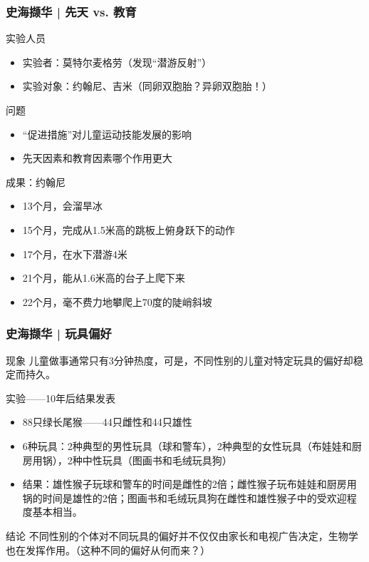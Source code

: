 \begin{frame}
  \frametitle{史海撷华 | 先天 vs. 教育}
  \begin{block}{实验人员}
    \begin{itemize}
      \item 实验者：莫特尔\textbullet 麦格劳（发现“潜游反射”）
      \item 实验对象：约翰尼、吉米（同卵双胞胎？异卵双胞胎！）
    \end{itemize}
  \end{block}
  \vspace{-0.5em}
  \pause
  \begin{block}{问题}
    \begin{itemize}
      \item “促进措施”对儿童运动技能发展的影响
      \item 先天因素和教育因素哪个作用更大
    \end{itemize}
  \end{block}
  \vspace{-0.5em}
  \pause
  \begin{block}{成果：约翰尼}
    \begin{itemize}
      \item 13个月，会溜旱冰
      \item 15个月，完成从1.5米高的跳板上俯身跃下的动作
      \item 17个月，在水下潜游4米
      \item 21个月，能从1.6米高的台子上爬下来
      \item 22个月，毫不费力地攀爬上70度的陡峭斜坡
    \end{itemize}
  \end{block}
\end{frame}

\begin{frame}
  \frametitle{史海撷华 | 玩具偏好}
  \begin{block}{现象}
    儿童做事通常只有3分钟热度，可是，不同性别的儿童对特定玩具的偏好却稳定而持久。
  \end{block}
  \vspace{-0.5em}
  \pause
  \begin{block}{实验——10年后结果发表}
    \begin{itemize}
      \item 88只绿长尾猴——44只雌性和44只雄性
      \item 6种玩具：2种典型的男性玩具（球和警车），2种典型的女性玩具（布娃娃和厨房用锅），2种中性玩具（图画书和毛绒玩具狗）
      \item 结果：雄性猴子玩球和警车的时间是雌性的2倍；雌性猴子玩布娃娃和厨房用锅的时间是雄性的2倍；图画书和毛绒玩具狗在雌性和雄性猴子中的受欢迎程度基本相当。
    \end{itemize}
  \end{block}
  \vspace{-0.5em}
  \pause
  \begin{block}{结论}
    不同性别的个体对不同玩具的偏好并不仅仅由家长和电视广告决定，生物学也在发挥作用。（这种不同的偏好从何而来？）
  \end{block}
\end{frame}

